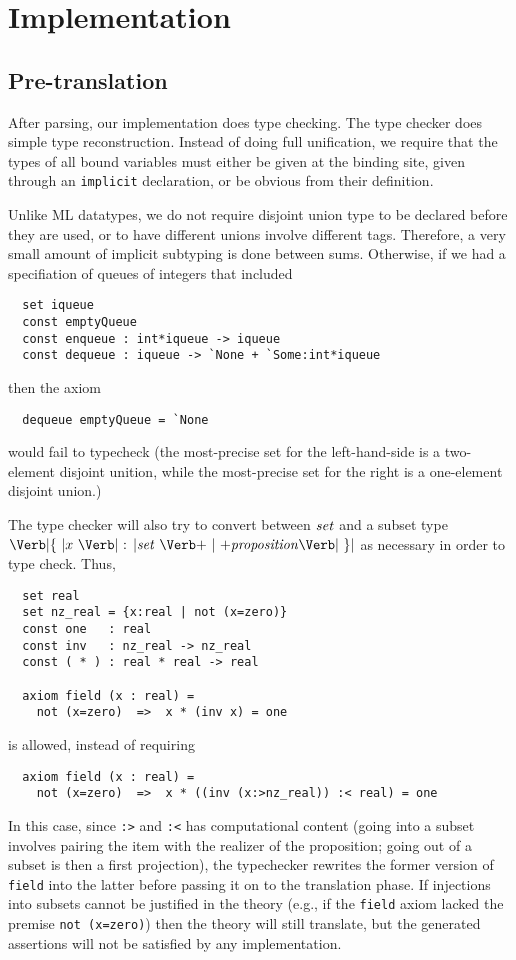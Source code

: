 
\section{Implementation}
\label{sec:implementation}

\subsection{Pre-translation}

After parsing, our implementation does type checking.  The type
checker does simple type reconstruction.  Instead of doing full
unification, we require that the types of all bound variables must
either be given at the binding site, given through an \Verb|implicit|
declaration, or be obvious from their definition.  

Unlike ML datatypes, we do not require disjoint union type
to be declared before they are used, or to have different unions
involve different tags.  Therefore, a very small amount of implicit 
subtyping is done between sums.  Otherwise, if we had a
specifiation of queues of integers that included
\begin{Verbatim}
  set iqueue
  const emptyQueue
  const enqueue : int*iqueue -> iqueue
  const dequeue : iqueue -> `None + `Some:int*iqueue
\end{Verbatim}
\goodbreak\noindent
then the axiom
\begin{Verbatim}
  dequeue emptyQueue = `None
\end{Verbatim}
would fail to typecheck (the most-precise set for the left-hand-side
is a two-element disjoint unition, while the most-precise set
for the right is a one-element disjoint union.)
\goodbreak

The type checker will also try to convert between $\mbox{\textit{set}}$ and a
subset type $\LBRACE
x \ \COLON \Setexp\ \BAR \Proposition \RBRACE$ as necessary in order
to type check.  Thus, 
\begin{Verbatim}
  set real
  set nz_real = {x:real | not (x=zero)}
  const one   : real
  const inv   : nz_real -> nz_real
  const ( * ) : real * real -> real

  axiom field (x : real) =
    not (x=zero)  =>  x * (inv x) = one
\end{Verbatim}
is allowed, instead of requiring
\begin{Verbatim}
  axiom field (x : real) =
    not (x=zero)  =>  x * ((inv (x:>nz_real)) :< real) = one
\end{Verbatim}
In this case, since \Verb|:>| and \Verb|:<| has computational content
(going into a subset involves pairing the item with the realizer of
the proposition; going out of a subset is then a first projection),
the typechecker rewrites the former version of \Verb|field| into the
latter before passing it on to the translation phase. If injections
into subsets cannot be justified in the theory (e.g., if the
\Verb|field| axiom lacked the premise \Verb|not (x=zero)|) then the
theory will still translate, but the generated assertions will not be
satisfied by any implementation.

